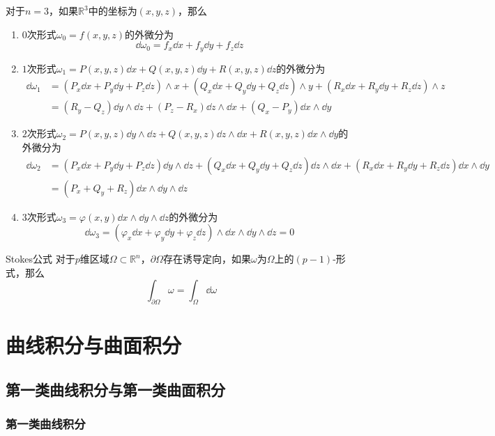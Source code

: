\documentclass[lang = cn, scheme = chinese, thmcnt = section]{elegantbook}
\newcommand{\R}{\mathbb{R}}            %
\newcommand{\sub}{\subset}             %
\begin{document}
\begin{example}
	对于$n=3$，如果$\R^3$中的坐标为$(x,y,z)$，那么
	\begin{enumerate}
		\item $0$次形式$\omega_0=f(x,y,z)$的外微分为%
		$$
		\dd\omega_0=f_x\dd x+f_y\dd y+f_z\dd z
		$$
		\item $1$次形式$\omega_1=P(x,y,z)\dd x+Q(x,y,z)\dd y+R(x,y,z)\dd z$的外微分为
		\begin{align*}
			\dd\omega_1
			& = (P_x\dd x+P_y\dd y+P_z\dd z)\wedge x
			+(Q_x\dd x+Q_y\dd y+Q_z\dd z)\wedge y
			+(R_x\dd x+R_y\dd y+R_z\dd z)\wedge z\\
			& = (R_y-Q_z)\dd y\wedge \dd z
			+(P_z-R_x)\dd z\wedge \dd x
			+(Q_x-P_y)\dd x\wedge \dd y
		\end{align*}
		\item $2$次形式$\omega_2=P(x,y,z)\dd y\wedge \dd z+Q(x,y,z)\dd z\wedge \dd x+R(x,y,z)\dd x\wedge \dd y$的外微分为
		\begin{align*}
			\dd\omega_2
			& = (P_x\dd x+P_y\dd y+P_z\dd z)\dd y\wedge \dd z
			+(Q_x\dd x+Q_y\dd y+Q_z\dd z)\dd z\wedge \dd x
			+(R_x\dd x+R_y\dd y+R_z\dd z)\dd x\wedge \dd y\\
			& = (P_x+Q_y+R_z)\dd x\wedge \dd y \wedge \dd z
		\end{align*}
		\item $3$次形式$\omega_3=\varphi(x,y)\dd x\wedge\dd y\wedge \dd z$的外微分为%
		$$
		\dd\omega_3
		=(\varphi_x\dd x+\varphi_y\dd y+\varphi_z\dd z)\wedge\dd x\wedge\dd y\wedge \dd z=0
		$$
	\end{enumerate}
\end{example}

\begin{theorem}{Stokes公式}
	对于$p$维区域$\Omega\sub\R^n$，$\partial \Omega$存在诱导定向，如果$\omega$为$\Omega$上的$(p-1)$-形式，那么%
	$$
	\int_{\partial\Omega}\omega=\int_\Omega\dd\omega
	$$
\end{theorem}

\chapter{曲线积分与曲面积分}

\section{第一类曲线积分与第一类曲面积分}

\subsection{第一类曲线积分}
\end{document}
